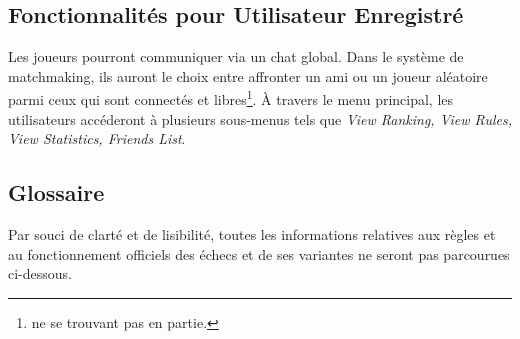 \documentclass[10pt, a4paper]{article}
\begin{document}
			\subsection{Fonctionnalités pour Utilisateur Enregistré}Les joueurs pourront communiquer via un chat global. Dans le système de matchmaking, ils auront le choix entre affronter un ami ou un joueur aléatoire parmi ceux qui sont connectés et libres\footnote{ne se trouvant pas en partie.}. À travers le menu principal, les utilisateurs accéderont à plusieurs sous-menus tels que {\itshape View Ranking, View Rules, View Statistics, Friends List}.%

		\subsection{Glossaire} Par souci de clarté et de lisibilité, toutes les informations relatives aux règles et au fonctionnement officiels des échecs et de ses variantes ne seront pas parcourues ci-dessous.
\end{document}
